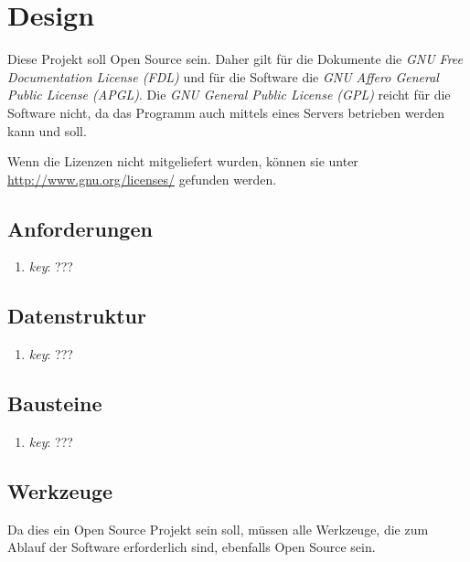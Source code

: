 \documentclass[english,ngerman,parskip=half,headsepline,footsepline]{scrreprt}
\begin{document}
	
	\chapter{Design}
	\thispagestyle{scrheadings}
	
	Diese Projekt soll Open Source sein. Daher gilt für die Dokumente die \emph{GNU Free Documentation License (FDL)} und für die Software die \emph{GNU Affero General Public License (APGL)}. Die \emph{GNU General Public License (GPL)} reicht für die Software nicht, da das Programm auch mittels eines Servers betrieben werden kann und soll.
	
	Wenn die Lizenzen nicht mitgeliefert wurden, können sie unter \url{http://www.gnu.org/licenses/} gefunden werden.
	
	\section{Anforderungen}
	\begin{enumerate}
		\item \label{Anforderung:key} \emph{key}: ???
	\end{enumerate}
	
	\section{Datenstruktur}
	\begin{enumerate}
		\item \label{Datenstruktur:key} \emph{key}: ???
	\end{enumerate}
	
	\section{Bausteine}
	\begin{enumerate}
		\item \label{Baustein:key} \emph{key}: ???
	\end{enumerate}
	
	\section{Werkzeuge}
	Da dies ein Open Source Projekt sein soll, müssen alle Werkzeuge, die zum Ablauf der Software erforderlich sind, ebenfalls Open Source sein.
	
\end{document}
